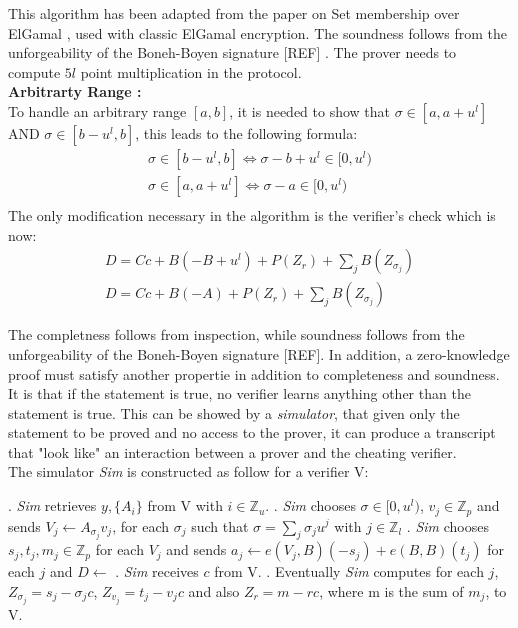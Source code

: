 \documentclass{article}
\begin{document}
This algorithm has been adapted from the paper on Set membership over ElGamal \cite{range}, used with classic ElGamal encryption. The soundness follows from the unforgeability of the Boneh-Boyen signature [REF] . The prover needs to compute $5l$ point multiplication in the protocol.\\
\textbf{Arbitrarty Range :}\\
To handle an arbitrary range $[a,b]$, it is needed to show that $\sigma \in [a,a+u^l]$ AND $ \sigma \in [b-u^l,b]$, this leads to the following formula:\\
\begin{gather*}
 \sigma \in [b-u^l,b] \Longleftrightarrow   \sigma - b + u^l \in [0,u^l) \\
\sigma \in [a,a+u^l] \Longleftrightarrow   \sigma - a  \in [0,u^l)\\
\end{gather*}
The only modification necessary in the algorithm is the verifier's check which is now:
\begin{gather*}
D = Cc+B(-B+u^l)+P(Z_r)+\sum_j{B(Z_{\sigma_j})}\\
D= Cc+B(-A)+P(Z_r)+\sum_j{B(Z_{\sigma_j})}
\end{gather*}

The completness follows from inspection, while soundness follows from the unforgeability of the Boneh-Boyen signature [REF].
In addition, a zero-knowledge proof must satisfy another propertie in addition to completeness and soundness. It is that if the statement is true, no verifier learns anything other than the statement is true.
This can be showed by a \textit{simulator}, that given only the statement to be proved and no access to the prover, it can produce a transcript that "look like" an interaction between a prover and the cheating verifier.\\
The simulator \textit{Sim} is constructed as follow for a verifier V:

\begin{algorithmic}
. \textit{Sim} retrieves $y,\{A_i\}$ from V with $i \in \mathbb{Z}_u$.
. \textit{Sim} chooses $\sigma \in [0,u^l)$, $v_j \in \mathbb{Z}_p$ and sends $V_j \gets A_{\sigma_j} v_j$, for each $\sigma_j$ such that $\sigma = \sum_{j}{\sigma_j u^j}$ with $ j \in \mathbb{Z}_l$
. \textit{Sim} chooses $s_j,t_j,m_j \in \mathbb{Z}_p$ for each $V_j$ and sends $a_j \gets e(V_j,B)(-s_j) + e(B,B)(t_j)$ for each $j$ and $D \gets $
. \textit{Sim} receives $c$ from V.
. Eventually \textit{Sim} computes for each $j$, $Z_{\sigma_j} =s_j - \sigma_j c$, $Z_{v_j} = t_j - v_j c$ and also $Z_r = m - rc$, where m is the sum of $m_j$, to V.  
\end{algorithmic}
\end{document}
